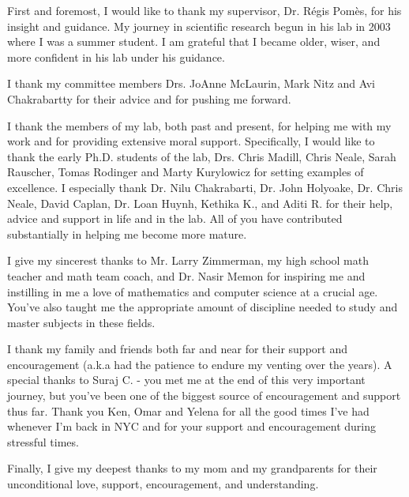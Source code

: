First and foremost, I would like to thank my supervisor, Dr. R\'{e}gis Pom\`{e}s, for his insight and guidance. My journey in scientific research begun in his lab in 2003 where I was a summer student.  I am grateful that I became older, wiser, and more confident in his lab under his guidance.

I thank my committee members Drs. JoAnne McLaurin, Mark Nitz and Avi Chakrabartty for their advice and for pushing me forward.

I thank the members of my lab, both past and present, for helping me with my work and for providing extensive moral support. Specifically, I would like to thank the early Ph.D. students of the lab, Drs. Chris Madill, Chris Neale, Sarah Rauscher, Tomas Rodinger and Marty Kurylowicz for setting examples of excellence. I especially thank Dr. Nilu Chakrabarti, Dr. John Holyoake, Dr. Chris Neale, David Caplan, Dr. Loan Huynh, Kethika K., and Aditi R. for their help, advice and support in life and in the lab. All of you have contributed substantially in helping me become more mature.

I give my sincerest thanks to Mr. Larry Zimmerman, my high school math teacher and math team coach, and Dr. Nasir Memon for inspiring me and instilling in me a love of mathematics and computer science at a crucial age. You've also taught me the appropriate amount of discipline needed to study and master subjects in these fields.

I thank my family and friends both far and near for their support and encouragement (a.k.a had the patience to endure my venting over the years).  A special thanks to Suraj C. - you met me at the end of this very important journey, but you've been one of the biggest source of encouragement and support thus far. Thank you Ken, Omar and Yelena for all the good times I've had whenever I'm back in NYC and for your support and encouragement during stressful times. 

Finally, I give my deepest thanks to my mom and my grandparents for their unconditional love, support, encouragement, and understanding.
